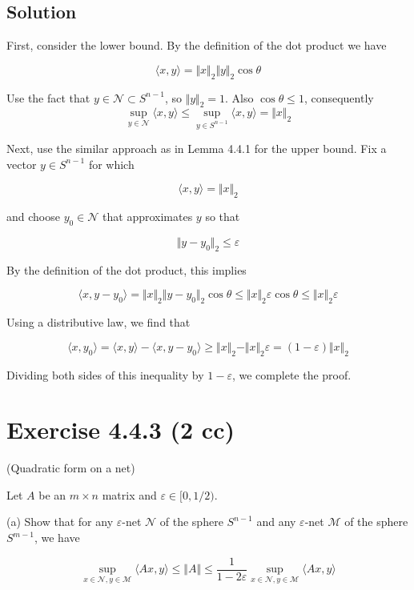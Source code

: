 \documentclass{article}
\begin{document}
\subsection{Solution}

First, consider the lower bound. By the definition of the dot product we have

$$\langle x, y \rangle = \Vert x \Vert_2 \Vert y \Vert_2 \cos \theta$$

Use the fact that $y \in \mathcal N \subset S^{n-1}$, so $\Vert y \Vert_2 = 1$. Also $\cos \theta \leq 1$, consequently
$$\sup_{y \in \mathcal N} \langle x, y \rangle \leq \sup_{y \in S^{n-1}} \langle x, y \rangle = \Vert x \Vert_2$$

Next, use the similar approach as in Lemma 4.4.1 for the upper bound. Fix a vector $y \in S^{n-1}$ for which

$$\langle x, y \rangle = \Vert x \Vert_2 $$

and choose $y_0 \in \mathcal N$ that approximates $y$ so that

$$\Vert y - y_0 \Vert_2 \leq \varepsilon$$

By the definition of the dot product, this implies

$$\langle x, y - y_0 \rangle = \Vert x \Vert_2 \Vert y - y_0 \Vert_2 \cos \theta \leq  \Vert x \Vert_2 \varepsilon \cos \theta \leq \Vert x \Vert_2 \varepsilon$$

Using a distributive law, we find that

$$\langle x, y_0 \rangle = \langle x, y \rangle - \langle x, y - y_0 \rangle \geq \Vert x \Vert_2 - \Vert x \Vert_2 \varepsilon = (1 - \varepsilon) \Vert x \Vert_2$$

Dividing both sides of this inequality by $1 - \varepsilon$, we complete the proof.

\section{Exercise 4.4.3 (2 cc)}
(Quadratic form on a net)

Let $A$ be an $m \times n$ matrix and $\varepsilon \in [0, 1/2)$.

(a) Show that for any $\varepsilon$-net $\mathcal N$ of the sphere $S^{n-1}$ and any $\varepsilon$-net $\mathcal M$ of the sphere $S^{m-1}$, we have

$$\sup_{x \in \mathcal N, y \in \mathcal M} \langle Ax, y \rangle \leq \Vert A \Vert \leq \frac{1}{1 - 2\varepsilon}\sup_{x \in \mathcal N, y \in \mathcal M} \langle Ax, y \rangle$$
\end{document}
